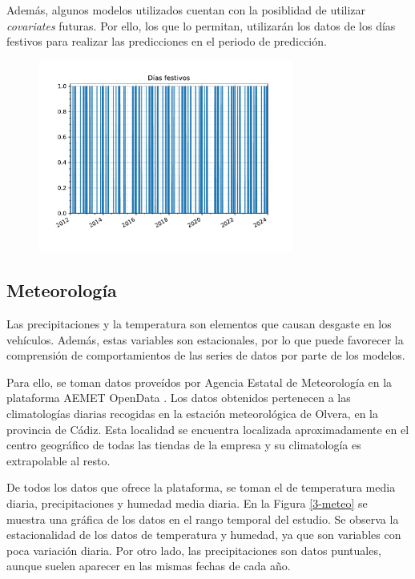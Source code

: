 Además, algunos modelos utilizados cuentan con la posiblidad de utilizar \textit{covariates} futuras. Por ello, los que lo permitan, utilizarán los datos de los días festivos para realizar las predicciones en el periodo de predicción.

\begin{figure}[H]
	{\includegraphics[width=0.75\textwidth]{imagenes/grafica_holidays.pdf}}
\end{figure}

\subsection{Meteorología}

Las precipitaciones y la temperatura son elementos que causan desgaste en los vehículos. Además, estas variables son estacionales, por lo que puede favorecer la comprensión de comportamientos de las series de datos por parte de los modelos.

Para ello, se toman datos proveídos por Agencia Estatal de Meteorología en la plataforma AEMET OpenData \cite{aemet}. Los datos obtenidos pertenecen a las climatologías diarias recogidas en la estación meteorológica de Olvera, en la provincia de Cádiz. Esta localidad se encuentra localizada aproximadamente en el centro geográfico de todas las tiendas de la empresa y su climatología es extrapolable al resto.

De todos los datos que ofrece la plataforma, se toman el de temperatura media diaria, precipitaciones y humedad media diaria. En la Figura \ref*{3-meteo} se muestra una gráfica de los datos en el rango temporal del estudio. Se observa la estacionalidad de los datos de temperatura y humedad, ya que son variables con poca variación diaria. Por otro lado, las precipitaciones son datos puntuales, aunque suelen aparecer en las mismas fechas de cada año.

